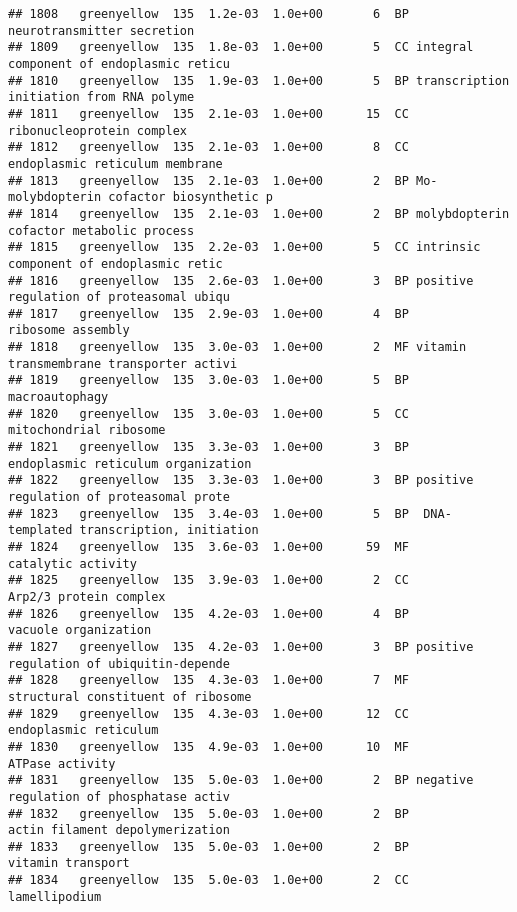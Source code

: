\documentclass[]{article}
\begin{document}
\begin{verbatim}
## 1808   greenyellow  135  1.2e-03  1.0e+00       6  BP               neurotransmitter secretion
## 1809   greenyellow  135  1.8e-03  1.0e+00       5  CC integral component of endoplasmic reticu
## 1810   greenyellow  135  1.9e-03  1.0e+00       5  BP transcription initiation from RNA polyme
## 1811   greenyellow  135  2.1e-03  1.0e+00      15  CC                ribonucleoprotein complex
## 1812   greenyellow  135  2.1e-03  1.0e+00       8  CC           endoplasmic reticulum membrane
## 1813   greenyellow  135  2.1e-03  1.0e+00       2  BP Mo-molybdopterin cofactor biosynthetic p
## 1814   greenyellow  135  2.1e-03  1.0e+00       2  BP molybdopterin cofactor metabolic process
## 1815   greenyellow  135  2.2e-03  1.0e+00       5  CC intrinsic component of endoplasmic retic
## 1816   greenyellow  135  2.6e-03  1.0e+00       3  BP positive regulation of proteasomal ubiqu
## 1817   greenyellow  135  2.9e-03  1.0e+00       4  BP                        ribosome assembly
## 1818   greenyellow  135  3.0e-03  1.0e+00       2  MF vitamin transmembrane transporter activi
## 1819   greenyellow  135  3.0e-03  1.0e+00       5  BP                           macroautophagy
## 1820   greenyellow  135  3.0e-03  1.0e+00       5  CC                   mitochondrial ribosome
## 1821   greenyellow  135  3.3e-03  1.0e+00       3  BP       endoplasmic reticulum organization
## 1822   greenyellow  135  3.3e-03  1.0e+00       3  BP positive regulation of proteasomal prote
## 1823   greenyellow  135  3.4e-03  1.0e+00       5  BP  DNA-templated transcription, initiation
## 1824   greenyellow  135  3.6e-03  1.0e+00      59  MF                       catalytic activity
## 1825   greenyellow  135  3.9e-03  1.0e+00       2  CC                   Arp2/3 protein complex
## 1826   greenyellow  135  4.2e-03  1.0e+00       4  BP                     vacuole organization
## 1827   greenyellow  135  4.2e-03  1.0e+00       3  BP positive regulation of ubiquitin-depende
## 1828   greenyellow  135  4.3e-03  1.0e+00       7  MF       structural constituent of ribosome
## 1829   greenyellow  135  4.3e-03  1.0e+00      12  CC                    endoplasmic reticulum
## 1830   greenyellow  135  4.9e-03  1.0e+00      10  MF                          ATPase activity
## 1831   greenyellow  135  5.0e-03  1.0e+00       2  BP negative regulation of phosphatase activ
## 1832   greenyellow  135  5.0e-03  1.0e+00       2  BP          actin filament depolymerization
## 1833   greenyellow  135  5.0e-03  1.0e+00       2  BP                        vitamin transport
## 1834   greenyellow  135  5.0e-03  1.0e+00       2  CC                            lamellipodium

\end{verbatim}
\end{document}
